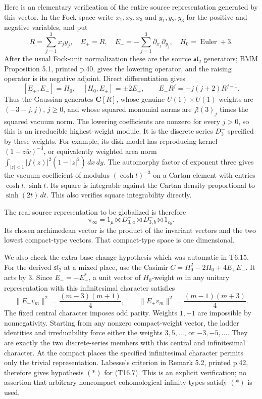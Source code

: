 \documentclass[11pt,a4paper]{article}
\theoremstyle{definition}
\begin{document}
Here is an elementary verification of the entire source representation generated by this vector. In the Fock space write \(x_1,x_2,x_3\) and \(y_1,y_2,y_3\) for the positive and negative variables, and put \[
R=\sum_{j=1}^3x_jy_j,
\quad E_+=R,
\quad E_-=-\sum_{j=1}^3\partial_{x_j}\partial_{y_j},
\quad H_0=\operatorname{Euler}+3.
\tag{T16.5}
\] After the usual Fock-unit normalization these are the source \(\mathfrak{sl}_2\) generators; BMM Proposition 5.1, printed p.40, gives the lowering operator, and the raising operator is its negative adjoint. Direct differentiation gives \[
[E_+,E_-]=H_0,\quad [H_0,E_\pm]=\pm2E_\pm,
\qquad E_-R^j=-j(j+2)R^{j-1}.
\tag{T16.6}
\] Thus the Gaussian generates \(\mathbf C[R]\), whose genuine \(U(1)\times U(1)\) weights are \((-3-j,j)\), \(j\ge0\), and whose squared monomial norms are \(j!(3)_j\) times the squared vacuum norm. The lowering coefficients are nonzero for every \(j>0\), so this is an irreducible highest-weight module. It is the discrete series \(D_3^-\) specified by these weights. For example, its disk model has reproducing kernel \((1-z\bar w)^{-3}\), or equivalently weighted area norm \(\int_{|z|<1}|f(z)|^2(1-|z|^2)\,dx\,dy\). The automorphy factor of exponent three gives the vacuum coefficient of modulus \((\cosh t)^{-3}\) on a Cartan element with entries \(\cosh t,\sinh t\). Its square is integrable against the Cartan density proportional to \(\sinh(2t)\,dt\). This also verifies square integrability directly.

The real source representation to be globalized is therefore \[
\pi_\infty=1_{\mu}\boxtimes D_{3,a}^-\boxtimes D_{3,b}^-\boxtimes1_{c_0}.
\tag{T16.7}
\] Its chosen archimedean vector is the product of the invariant vectors and the two lowest compact-type vectors. That compact-type space is one dimensional.

We also check the extra base-change hypothesis which was automatic in T6.15. For the derived \(\mathfrak{sl}_2\) at a mixed place, use the Casimir \(C=H_0^2-2H_0+4E_+E_-\). It acts by \(3\). Since \(E_-=-E_+^*\), a unit vector of \(H_0\)-weight \(m\) in any unitary representation with this infinitesimal character satisfies \[
\|E_-v_m\|^2=\frac{(m-3)(m+1)}4,
\qquad
\|E_+v_m\|^2=\frac{(m-1)(m+3)}4.
\tag{T16.8}
\] The fixed central character imposes odd parity. Weights \(1,-1\) are impossible by nonnegativity. Starting from any nonzero compact-weight vector, the ladder identities and irreducibility force either the weights \(3,5,\ldots\), or \(-3,-5,\ldots\). They are exactly the two discrete-series members with this central and infinitesimal character. At the compact places the specified infinitesimal character permits only the trivial representation. Labesse's criterion in Remark 5.2, printed p.42, therefore gives hypothesis \((*)\) for (T16.7). This is an explicit verification; no assertion that arbitrary noncompact cohomological infinity types satisfy \((*)\) is used.
\end{document}
